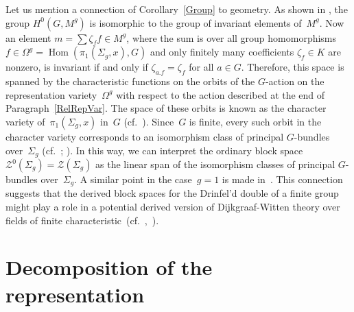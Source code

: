 \documentclass[12pt]{article}
\theoremstyle{definition}
\theoremstyle{break}
\DeclareMathOperator\Hom{Hom}
\renewcommand{\1}{\mathbbm{1}}
\newcommand{\TFT}{\mathcal{Z}}
\begin{document}
Let us mention a connection of Corollary~\ref{Group} to geometry. As shown in
\cite[Chap.~VI, Prop.~3.1, p.~191]{HiS}, the group $H^0(G, M^g)$ is isomorphic to the group of invariant elements of~$M^g$. Now an element $m = \sum \zeta_f f \in M^g$, where the sum is over all group homomorphisms~$f \in \Omega^g = \Hom(\pi_1(\Sigma_{g},x),G)$ and only finitely many coefficients $\zeta_f \in K$ are nonzero, is invariant if and only if $\zeta_{a.f} = \zeta_f$ for all $a \in G$. Therefore, this space is spanned by the characteristic functions on the orbits of the \mbox{$G$-action} on the representation variety~$\Omega^g$ with respect to the action described at the end of Paragraph~\ref{RelRepVar}. The space of these orbits is known as the character variety of~$\pi_1(\Sigma_{g},x)$ in~$G$ (cf.~\cite[Sec.~11, p.~5191]{Si}). Since~$G$ is finite, every such orbit in the character variety corresponds to an isomorphism class of principal $G$-bundles over~$\Sigma_{g}$ (cf.~\cite[Exerc.~14.3, p.~196]{F}; \cite[\S~13.9, p.~66]{St}). In this way, we can interpret the ordinary block space~$\TFT^0(\Sigma_{g}) = \TFT(\Sigma_{g})$ as the linear span of the isomorphism classes of principal $G$-bundles over~$\Sigma_{g}$. A similar point in the case~$g=1$ is made in~\cite[Prop.~3.3, p.~3705]{SW}. This connection suggests that the derived block spaces for the Drinfel'd double of a finite group might play a role in a potential derived version of Dijkgraaf-Witten theory over fields of finite characteristic~(cf.~\cite{DW},~\cite{FQ}).


\section{Decomposition of the representation} \label{Sec:DecRep}
\end{document}

